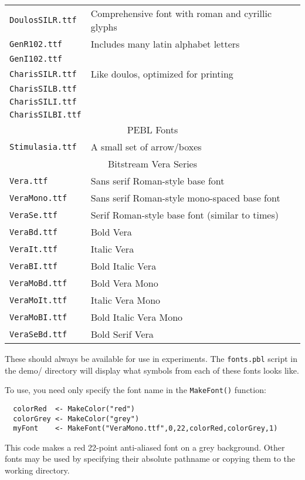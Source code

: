 \begin{table}[htbp]
\begin{tabular}{ll}
\texttt{DoulosSILR.ttf}&Comprehensive font with roman and cyrillic glyphs\\
\texttt{GenR102.ttf}& Includes many latin alphabet letters\\
\texttt{GenI102.ttf}& \\
\texttt{CharisSILR.ttf}& Like doulos, optimized for printing\\
\texttt{CharisSILB.ttf}&\\
\texttt{CharisSILI.ttf}& \\    
\texttt{CharisSILBI.ttf}& \\   
\midrule
\multicolumn{2}{c}{PEBL Fonts}\\
\texttt{Stimulasia.ttf}& A small set of arrow/boxes\\
\midrule
\multicolumn{2}{c}{Bitstream Vera Series}\\
\texttt{Vera.ttf}    &     Sans serif Roman-style base font\\
\texttt{VeraMono.ttf}&     Sans serif Roman-style mono-spaced base font\\
\texttt{VeraSe.ttf}  &     Serif Roman-style base font (similar to times)\\
\texttt{VeraBd.ttf}  &     Bold Vera\\
\texttt{VeraIt.ttf}  &     Italic Vera\\
\texttt{VeraBI.ttf}  &     Bold Italic Vera\\
\texttt{VeraMoBd.ttf}&     Bold Vera Mono\\
\texttt{VeraMoIt.ttf}&     Italic Vera Mono\\
\texttt{VeraMoBI.ttf}&     Bold Italic Vera Mono\\
\texttt{VeraSeBd.ttf}&     Bold Serif Vera\\
\bottomrule
\end{tabular}
\label{tab:fonts}
\end{table}



These should always be available for use in experiments.  The
\texttt{fonts.pbl} script in the demo/ directory will display what
symbols from each of these fonts looks like.

To use, you need only specify the font name in the \texttt{MakeFont()} function:
\begin{verbatim}
  colorRed  <- MakeColor("red")
  colorGrey <- MakeColor("grey")
  myFont    <- MakeFont("VeraMono.ttf",0,22,colorRed,colorGrey,1)
\end{verbatim}
This code makes a red 22-point anti-aliased font on a grey background. 
Other fonts may be used by specifying their absolute pathname 
or copying them to the working directory.


